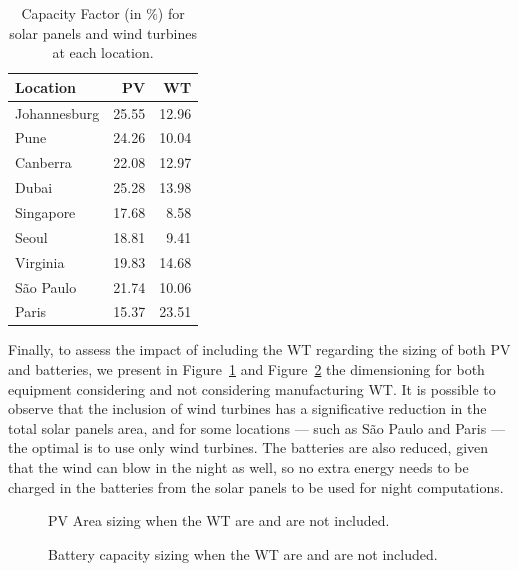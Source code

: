 \begin{table}[h]
  
  \caption{Capacity Factor (in \%) for solar panels and wind turbines at each location.}\label{tab:capacity_factor} \centering
  
  \begin{tabular}{|l|r|r|}
  \hline    
  \textbf{Location} &   \textbf{PV} & \textbf{WT}  \\
  \hline
  Johannesburg & 25.55 & 12.96  \\
  \hline
  Pune        &  24.26   & 10.04    \\
  \hline
  Canberra    & 22.08    & 12.97  \\
  \hline
  Dubai      & 25.28      & 13.98   \\
  \hline
  Singapore & 17.68    & 8.58   \\
  \hline     
  Seoul      & 18.81   &  9.41   \\
  \hline
  Virginia   & 19.83   &  14.68 \\
  \hline
  São Paulo  & 21.74   &  10.06    \\
  \hline 
  Paris      & 15.37   &  23.51   \\
  \hline  

\end{tabular}
\end{table}


Finally, to assess the impact of including the WT regarding the sizing of both PV and batteries, we present in Figure~\ref{fig:wind_pv} and Figure~\ref{fig:wind_bat}  the dimensioning for both equipment considering and not considering manufacturing WT. It is possible to observe that the inclusion of wind turbines has a significative reduction in the total solar panels area, and for some locations --- such as São Paulo and Paris --- the optimal is to use only wind turbines. The batteries are also reduced, given that the wind can blow in the night as well, so no extra energy needs to be charged in the batteries from the solar panels to be used for night computations.

\begin{figure}[H]
  \centering
  {}
  \caption{PV Area sizing when the WT are and are not included. }
  \label{fig:wind_pv}
\end{figure}


\begin{figure}[H]
  \centering
  {}
  \caption{Battery capacity sizing when the WT are and are not included. }
  \label{fig:wind_bat}

\end{figure}


